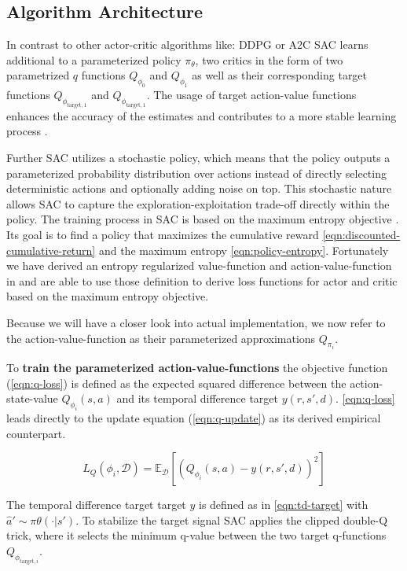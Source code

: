 \subsection{Algorithm Architecture}\label{sec:SAC-architectur}

In contrast to other actor-critic algorithms like: DDPG \cite{DDPG_Paper} or A2C \cite{A2C_Paper} SAC learns additional to a parameterized policy $\pi_\theta$, two critics in the form of two parametrized $q$ functions $Q_{\phi_0}$ and $Q_{\phi_1}$ as well as their corresponding target functions $Q_{\phi_{\text{target}, 1}}$ and $Q_{\phi_{\text{target}, 1}}$. The usage of target action-value functions enhances the accuracy of the estimates and contributes to a more stable learning process \cite{SAC_Applications_Paper}.

Further SAC utilizes a stochastic policy, which means that the policy outputs a parameterized probability distribution over actions instead of directly selecting deterministic actions and optionally adding noise on top. This stochastic nature allows SAC to capture the exploration-exploitation trade-off directly within the policy.
The training process in SAC is based on the maximum entropy objective \cite{SpinningUp2018}. Its goal is to find a policy that maximizes the cumulative reward \eqref{eqn:discounted-cumulative-return} and the maximum entropy \eqref{eqn:policy-entropy}. Fortunately we have derived an entropy regularized value-function and action-value-function in  and are able to use those definition to derive loss functions for actor and critic based on the maximum entropy objective. 

Because we will have a closer look into actual implementation, we now refer to the action-value-function as their parameterized approximations $Q_{\pi_i}$.

To \textbf{train the parameterized action-value-functions} the objective function (\ref{eqn:q-loss}) is defined as the expected squared difference between the action-state-value $Q_{\phi_i}(s, a)$ and its temporal difference target $y(r, s', d)$. \eqref{eqn:q-loss} leads directly to the update equation (\ref{eqn:q-update}) as its derived empirical counterpart.

\begin{equation}\label{eqn:q-loss}
	L_Q(\phi_i, \mathcal{D}) = \mathbb{E}_\mathcal{D}\left[\left(Q_{\phi_i}(s, a) - y(r, s', d)\right)^2\right]
\end{equation}

The temporal difference target target $y$ is defined as in \eqref{eqn:td-target} with $\hat{a}' \sim \pi\theta(\cdot| s')$. To stabilize the target signal SAC applies the clipped double-Q trick, where it selects the minimum q-value between the two target q-functions $Q_{\phi_{\text{target}, i}}$.

